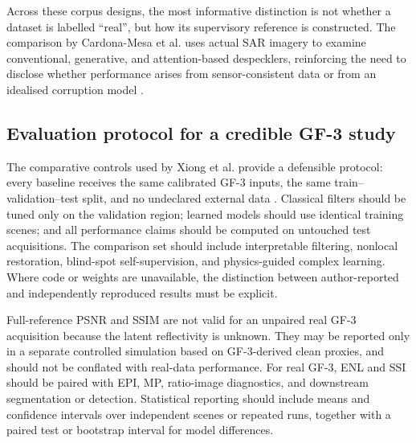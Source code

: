 \documentclass[11pt]{article}
\begin{document}
Across these corpus designs, the most informative distinction is not whether a dataset is labelled ``real'', but how its supervisory reference is constructed. The comparison by Cardona-Mesa et al. uses actual SAR imagery to examine conventional, generative, and attention-based despecklers, reinforcing the need to disclose whether performance arises from sensor-consistent data or from an idealised corruption model \cite{CardonaMesa2025GenAI}.

\subsection{Evaluation protocol for a credible GF-3 study}

The comparative controls used by Xiong et al. provide a defensible protocol: every baseline receives the same calibrated GF-3 inputs, the same train--validation--test split, and no undeclared external data \cite{Xiong2026PCSDD}. Classical filters should be tuned only on the validation region; learned models should use identical training scenes; and all performance claims should be computed on untouched test acquisitions. The comparison set should include interpretable filtering, nonlocal restoration, blind-spot self-supervision, and physics-guided complex learning. Where code or weights are unavailable, the distinction between author-reported and independently reproduced results must be explicit.

Full-reference PSNR and SSIM are not valid for an unpaired real GF-3 acquisition because the latent reflectivity is unknown. They may be reported only in a separate controlled simulation based on GF-3-derived clean proxies, and should not be conflated with real-data performance. For real GF-3, ENL and SSI should be paired with EPI, MP, ratio-image diagnostics, and downstream segmentation or detection. Statistical reporting should include means and confidence intervals over independent scenes or repeated runs, together with a paired test or bootstrap interval for model differences.
\end{document}
